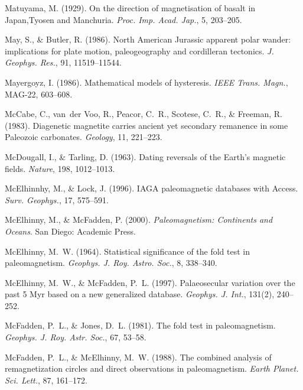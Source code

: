 \documentclass[,plain]{tauxe}
\begin{document}
\begin{thebibliography}{}
\bibitem{}%
Matuyama, M. (1929).
On the direction of magnetisation of basalt in Japan,\break Tyosen and Manchuria.
{\it Proc. Imp. Acad. Jap.}, 5, 203--205.

\bibitem{}%
May, S., \& Butler, R. (1986).
North American Jurassic apparent polar wander: implications for plate motion, paleogeography and cordilleran tectonics.
{\it J. Geophys. Res.}, 91, 11519--11544.

\bibitem{}%
Mayergoyz, I. (1986).
Mathematical models of hysteresis.
{\it IEEE Trans. Magn.}, MAG-22, 603--608.

\bibitem{}%
McCabe, C., van~der Voo, R., Peacor, C.~R., Scotese, C.~R., \& Freeman, R. (1983).
Diagenetic magnetite carries ancient yet secondary remanence in some Paleozoic carbonates.
{\it Geology}, 11, 221--223.

\bibitem{}%
McDougall, I., \& Tarling, D. (1963).
Dating reversals of the Earth's magnetic fields.
{\it Nature}, 198, 1012--1013.

\bibitem{}%
McElhinnhy, M., \& Lock, J. (1996).
IAGA paleomagnetic databases with Access.
{\it Surv. Geophys.}, 17, 575--591.


\bibitem{}%
McElhinny, M., \& McFadden, P. (2000).
{\it Paleomagnetism: Continents and Oceans}.
San Diego: Academic Press.

\bibitem{}%
McElhinny, M.~W. (1964).
Statistical significance of the fold test in paleomagnetism.
{\it Geophys. J. Roy. Astro. Soc.}, 8, 338--340.

\bibitem{}%
McElhinny, M.~W., \& McFadden, P.~L. (1997).
Palaeosecular variation over the past 5 Myr based on a new generalized database.
{\it Geophys. J. Int.}, 131(2), 240--252.

\bibitem{}%
McFadden, P.~L., \& Jones, D.~L. (1981).
The fold test in paleomagnetism.
{\it Geophys. J. Roy. Astr. Soc.}, 67, 53--58.

\bibitem{}%
McFadden, P.~L., \& McElhinny, M.~W. (1988).
The combined analysis of remagnetization circles and direct observations in paleomagnetism.
{\it Earth Planet. Sci. Lett.}, 87, 161--172.


\end{thebibliography}
\end{document}
